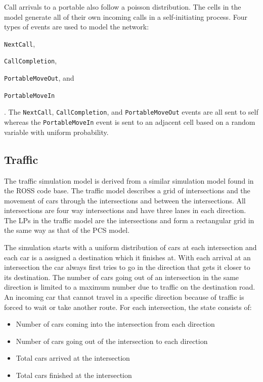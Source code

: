 \documentclass[11pt]{book}
\begin{document}
\noindent
Call arrivals to a portable also follow a poisson distribution.  The cells in the model generate all
of their own incoming calls in a self-initiating process.  Four types of events are used to model
the network: \begin{inparaenum}[(1)] \item \texttt{NextCall},
\item \texttt{CallCompletion}, \item \texttt{PortableMoveOut}, and \item \texttt{PortableMoveIn}
\end{inparaenum}.  The \texttt{NextCall}, \texttt{CallCompletion}, and \texttt{PortableMoveOut}
events are all sent to self whereas the \texttt{PortableMoveIn} event is sent to an adjacent
cell based on a random variable with uniform probability.

\subsection{Traffic}

The traffic simulation model is derived from a similar simulation model found in the ROSS
\cite{carothers-00} code base.  The traffic model describes a grid of intersections and the movement
of cars through the intersections and between the intersections.  All intersections are four way
intersections and have three lanes in each direction.  The LPs in the traffic model are the
intersections and form a rectangular grid in the same way as that of the PCS model.

The simulation starts with a uniform distribution of cars at each intersection and each car is a
assigned a destination which it finishes at.  With each arrival at an intersection the car always
first tries to go in the direction that gets it closer to its destination.  The number of cars going
out of an intersection in the same direction is limited to a maximum number due to traffic on the
destination road.  An incoming car that cannot travel in a specific direction because of traffic is
forced to wait or take another route.  For each intersection, the state consists of:

\begin{itemize}
    \item Number of cars coming into the intersection from each direction
    \item Number of cars going out of the intersection to each direction
    \item Total cars arrived at the intersection
    \item Total cars finished at the intersection
\end{itemize}
\end{document}
